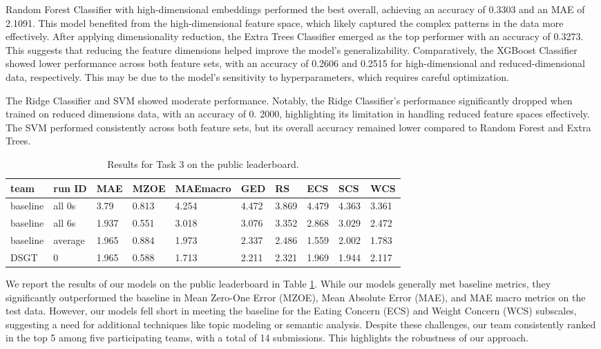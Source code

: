 \documentclass[]{style/ceurart}
\begin{document}
Random Forest Classifier with high-dimensional embeddings performed the best overall, achieving an accuracy of 0.3303 and an MAE of 2.1091.
This model benefited from the high-dimensional feature space, which likely captured the complex patterns in the data more effectively.
After applying dimensionality reduction, the Extra Trees Classifier emerged as the top performer with an accuracy of 0.3273.
This suggests that reducing the feature dimensions helped improve the model's generalizability.
Comparatively, the XGBoost Classifier showed lower performance across both feature sets, with an accuracy of 0.2606 and 0.2515 for high-dimensional and reduced-dimensional data, respectively.
This may be due to the model's sensitivity to hyperparameters, which requires careful optimization.

The Ridge Classifier and SVM showed moderate performance.
Notably, the Ridge Classifier's performance significantly dropped when trained on reduced dimensions data, with an accuracy of 0.
2000, highlighting its limitation in handling reduced feature spaces effectively.
The SVM performed consistently across both feature sets, but its overall accuracy remained lower compared to Random Forest and Extra Trees.

\begin{table}[h]
  \caption{Results for Task 3 on the public leaderboard.}
  \label{tab:task3-results}
  \begin{tabular}{llllllllll}
  \toprule
  team     & run ID  & MAE   & MZOE  & MAEmacro & GED   & RS    & ECS   & SCS   & WCS   \\ \midrule
  baseline & all 0s  & 3.79  & 0.813 & 4.254    & 4.472 & 3.869 & 4.479 & 4.363 & 3.361 \\
  baseline & all 6s  & 1.937 & 0.551 & 3.018    & 3.076 & 3.352 & 2.868 & 3.029 & 2.472 \\
  baseline & average & 1.965 & 0.884 & 1.973    & 2.337 & 2.486 & 1.559 & 2.002 & 1.783 \\ \midrule
  DSGT     & 0       & 1.965 & 0.588 & 1.713    & 2.211 & 2.321 & 1.969 & 1.944 & 2.117 \\ \bottomrule
  \end{tabular}
\end{table}

We report the results of our models on the public leaderboard in Table \ref{tab:task3-results}.
While our models generally met baseline metrics, they significantly outperformed the baseline in Mean Zero-One Error (MZOE), Mean Absolute Error (MAE), and MAE macro metrics on the test data. 
However, our models fell short in meeting the baseline for the Eating Concern (ECS) and Weight Concern (WCS) subscales, suggesting a need for additional techniques like topic modeling or semantic analysis.
Despite these challenges, our team consistently ranked in the top 5 among five participating teams, with a total of 14 submissions. This highlights the robustness of our approach. 
\end{document}
